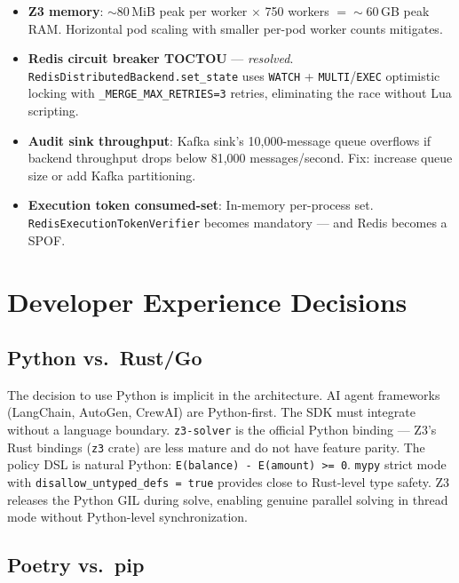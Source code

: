 \documentclass[12pt,a4paper,oneside]{report}
\newcommand{\code}[1]{\texttt{#1}}           %
\begin{document}
\begin{itemize}
  \item \textbf{Z3 memory}: $\sim$80\,MiB peak per worker $\times$ 750 workers
        $= \sim$60\,GB peak RAM. Horizontal pod scaling with smaller per-pod
        worker counts mitigates.

  \item \textbf{Redis circuit breaker TOCTOU} --- \textit{resolved}.
        \code{RedisDistributedBackend.set\_state} uses \code{WATCH} +
        \code{MULTI}/\code{EXEC} optimistic locking with
        \code{\_MERGE\_MAX\_RETRIES=3} retries, eliminating the race
        without Lua scripting.

  \item \textbf{Audit sink throughput}: Kafka sink's 10,000-message queue
        overflows if backend throughput drops below 81,000 messages/second.
        Fix: increase queue size or add Kafka partitioning.

  \item \textbf{Execution token consumed-set}: In-memory per-process set.
        \code{RedisExecutionTokenVerifier} becomes mandatory --- and Redis
        becomes a SPOF.
\end{itemize}

\chapter{Developer Experience Decisions}

\section{Python vs.\ Rust/Go}

The decision to use Python is implicit in the architecture. AI agent frameworks
(LangChain, AutoGen, CrewAI) are Python-first. The SDK must integrate without
a language boundary. \code{z3-solver} is the official Python binding --- Z3's
Rust bindings (\code{z3} crate) are less mature and do not have feature parity.
The policy DSL is natural Python: \code{E(balance) - E(amount) >= 0}. \code{mypy}
strict mode with \code{disallow\_untyped\_defs = true} provides close to
Rust-level type safety. Z3 releases the Python GIL during solve, enabling
genuine parallel solving in thread mode without Python-level synchronization.

\section{Poetry vs.\ pip}
\end{document}
